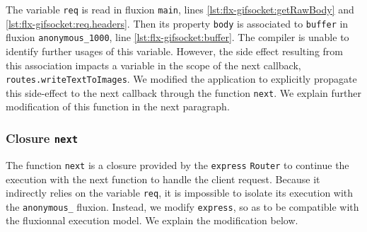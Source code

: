 The variable \texttt{req} is read in fluxion \texttt{main}, lines \ref{lst:flx-gifsocket:getRawBody} and \ref{lst:flx-gifsocket:req.headers}.
Then its property \texttt{body} is associated to \texttt{buffer} in fluxion \texttt{anonymous\_1000}, line \ref{lst:flx-gifsocket:buffer}.
The compiler is unable to identify further usages of this variable.
However, the side effect resulting from this association impacts a variable in the scope of the next callback, \texttt{routes.writeTextToImages}.
We modified the application to explicitly propagate this side-effect to the next callback through the function \texttt{next}.
We explain further modification of this function in the next paragraph.


\subsubsection{Closure \texttt{next}}

The function \texttt{next} is a closure provided by the \texttt{express} \texttt{Router} to continue the execution with the next function to handle the client request.
Because it indirectly relies on the variable \texttt{req}, it is impossible to isolate its execution with the \texttt{anonymous\_} fluxion.
Instead, we modify \texttt{express}, so as to be compatible with the fluxionnal execution model.
We explain the modification below.%



